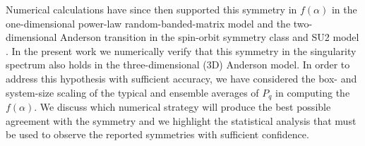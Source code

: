 Numerical calculations have since then supported this symmetry in  $f(\alpha)$ in the one-dimensional power-law random-banded-matrix model \cite{MirFME06} and the two-dimensional Anderson transition in the spin-orbit symmetry class \cite{ObuSFGL07} and SU2 model \cite{MilE07}.  In the present work we numerically verify that this symmetry in the singularity spectrum also holds in the three-dimensional (3D) Anderson model. In order to address this hypothesis with sufficient accuracy, we have considered the box- and system-size scaling of the typical and ensemble averages of $P_q$ in computing the $f(\alpha)$. We discuss which numerical strategy will produce the best possible agreement with the symmetry and we highlight the statistical analysis that must be used to observe the reported symmetries with sufficient confidence.
%
%
%

